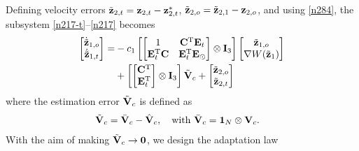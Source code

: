 
Defining velocity errors $\tilde{\mathbf{z}}_{2, t} = \mathbf{z}_{2, t} - \mathbf{z}_{2, t}^*$, $\tilde{\mathbf{z}}_{2, o} = \tilde{\mathbf{z}}_{2, 1} - \mathbf{z}_{2, o}$, and using \eqref{n284}, the subsystem \eqref{n217-t}--\eqref{n217} becomes
\begin{equation}\label{553}\begin{aligned}[b]
\left[\begin{matrix}
\dot{\tilde{\mathbf{z}}}_{1, o}\\\dot{\tilde{\mathbf{z}}}_{1, t}
\end{matrix}\right]=&-c_1\left[\left[\begin{matrix}
1&\mathbf{C}^{\mathrm{T}} \mathbf{E}_t\\\mathbf{E}_t^{\mathrm{T}} \mathbf{C}&\mathbf{E}_t^{\mathrm{T}} \mathbf{E}_\odot
\end{matrix}\right]\otimes \mathbf{I}_3\right]\left[\begin{matrix}
{\tilde{\mathbf{z}}}_{1, o}\\\nabla W({\tilde{\mathbf{z}}}_{1})
\end{matrix}\right]\\&+\left[\left[\begin{matrix}
\mathbf{C}^{\mathrm{T}}\\\mathbf{E}_t^{\mathrm{T}}
\end{matrix}\right]\otimes \mathbf{I}_3\right]\tilde{\mathbf{V}}_c +\left[\begin{matrix}
\tilde{\mathbf{z}}_{2, o}\\\tilde{\mathbf{z}}_{2, t}
\end{matrix}\right]
\end{aligned}\end{equation}
where the estimation error $\tilde{\mathbf{V}}_c$ is defined as
\begin{equation}\label{548}\begin{aligned}[b]
\tilde{\mathbf{V}}_c&=\bar{\mathbf{V}}_c-\hat{\mathbf{V}}_c,\quad \text{with } \bar{\mathbf{V}}_c = \mathbf{1}_N\otimes\mathbf{V}_c.
\end{aligned}\end{equation}
With the aim of making $\tilde{\mathbf{V}}_c \rightarrow \mathbf{0}$, we design the adaptation law
